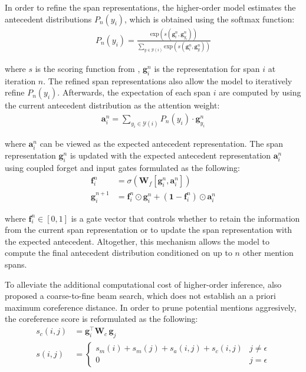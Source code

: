 \documentclass[11pt]{article}
\begin{document}
In order to refine the span representations, the higher-order model estimates the antecedent distributions $P_{n}(y_{i})$, which is obtained using the softmax function:
\begin{align}
P_{n}(y_{i}) = \frac{\text{exp}(s(\pmb{g}_{i}^{n}, \pmb{g}_{y_{i}}^{n}))}{\sum_{y \in \mathcal{Y}(i)} \text{exp}(s(\pmb{g}_{i}^{n}, \pmb{g}_{y}^{n}))}
\end{align}

where $s$ is the scoring function from \parencite{lee2017end}, $\pmb{g}_{i}^{n}$ is the representation for span $i$ at iteration $n$. The refined span representations also allow the model to iteratively refine $P_{n}(y_{i})$. Afterwards, the expectation of each span $i$ are computed by using the current antecedent distribution as the attention weight:
\begin{align}
\pmb{a}_{i}^{n} = \sum\limits_{y_{i} \in \mathcal{Y}(i)} P_{n}(y_{i}) \cdot \pmb{g}_{y_{i}}^{n}
\end{align}

where $\pmb{a}_{i}^{n}$ can be viewed as the expected antecedent representation. The span representation $\pmb{g}_{i}^{n}$ is updated with the expected antecedent representation $\pmb{a}_{i}^{n}$ using coupled forget and input gates formulated as the following:
\begin{align}
\pmb{f}_{i}^{n} &= \sigma(\textbf{W}_{f}[\pmb{g}_{i}^{n}, \pmb{a}_{i}^{n}]) \\
\pmb{g}_{i}^{n+1} &= \pmb{f}_{i}^{n} \odot \pmb{g}_{i}^{n} + (\mathbf{1} - \pmb{f}_{i}^{n}) \odot \pmb{a}_{i}^{n}
\end{align}

where $\pmb{f}_{i}^{n} \in [0,1]$ is a gate vector that controls whether to retain the information from the current span representation or to update the span representation with the expected antecedent. Altogether, this mechanism allows the model to compute the final antecedent distribution conditioned on up to $n$ other mention spans. 

To alleviate the additional computational cost of higher-order inference, \parencite{lee2018higher} also proposed a coarse-to-fine beam search, which does not establish an a priori maximum coreference distance. In order to prune potential mentions aggresively, the coreference score is reformulated as the following:
\begin{align}
s_{c}(i, j) &= \pmb{g}_{i}^{\top}\textbf{W}_{c}\, \pmb{g}_{j}\\
s(i, j) &= \begin{cases}
s_{m}(i) + s_{m}(j) + s_{a}(i, j) + s_{c}(i, j) & j \neq \epsilon \\
0 & j = \epsilon
\end{cases}
\end{align}
\end{document}
